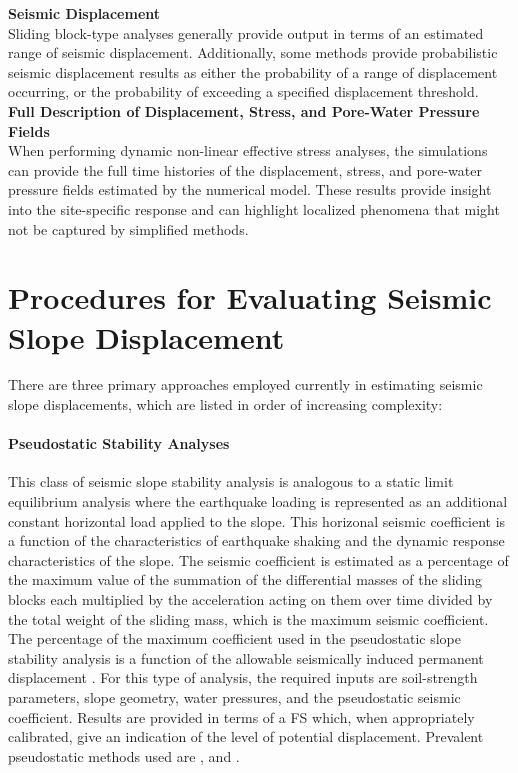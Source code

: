 \noindent\textbf{Seismic Displacement}\\
Sliding block-type analyses generally provide output in terms of an estimated range of seismic displacement. Additionally, some methods provide probabilistic seismic displacement results as either the probability of a range of displacement occurring, or the probability of exceeding a specified displacement threshold.\\

\noindent\textbf{Full Description of Displacement, Stress, and Pore-Water Pressure Fields}\\
When performing dynamic non-linear effective stress analyses, the simulations can provide the full time histories of the displacement, stress, and pore-water pressure fields estimated by the numerical model. These results provide insight into the site-specific response and can highlight localized phenomena that might not be captured by simplified methods.

\section{Procedures for Evaluating Seismic Slope Displacement}
\label{sec:eq_landslide_methods}

There are three primary approaches employed currently in estimating seismic slope displacements, which are listed in order of increasing complexity:
\newline

\paragraph{Pseudostatic Stability Analyses} 
This class of seismic slope stability analysis is analogous to a static limit equilibrium analysis where the earthquake loading is represented as an additional constant horizontal load applied to the slope. This horizonal seismic coefficient is a function of the characteristics of earthquake shaking and the dynamic response characteristics of the slope. The seismic coefficient is estimated as a percentage of the maximum value of the summation of the differential masses of the sliding blocks each multiplied by the acceleration acting on them over time divided by the total weight of the sliding mass, which is the maximum seismic coefficient. The percentage of the maximum coefficient used in the pseudostatic slope stability analysis is a function of the allowable seismically induced permanent displacement \citep{bray2009pseudostatic}. For this type of analysis, the required inputs are soil-strength parameters, slope geometry, water pressures, and the pseudostatic seismic coefficient. Results are provided in terms of a FS which, when appropriately calibrated, give an indication of the level of potential displacement. Prevalent pseudostatic methods used are \cite{seed1979considerations, hynes-griffin1984rationalizing, bray2009pseudostatic, macedo2018performancebased}, and \cite{bray2019procedure}.
\newline

